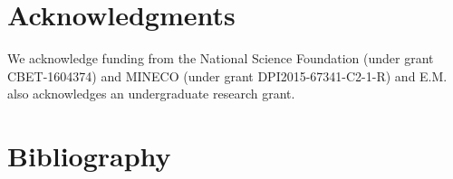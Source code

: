 \begin{refsection}[referencesCh2]
{\color{red}{CHECK IF ALL THESE VARIABLES APPEAR IN THE CHAPTER}}
\vspace{-0.8cm}
\begingroup     
\let\clearpage\relax
%

%
\glsaddall
\setlength\LTleft{0pt}
\setlength\LTright{0pt}
\setlength\glsdescwidth{0.8\hsize}
\renewcommand*{\glossarypreamble}{\vspace{-0.8cm}}
\printglossary[type=SetsCh2, style=long]
\vspace{10pt}
\printglossary[type=ParamCh2, style=long]
\vspace{10pt}
\printglossary[type=VarCh2, style=long]
\endgroup

\section*{Acknowledgments} \label{section:Acknowledgments}
We acknowledge funding from the National Science Foundation (under grant CBET-1604374) and MINECO (under grant DPI2015-67341-C2-1-R) and E.M. also acknowledges an undergraduate research grant.

\section*{Bibliography}

\printbibliography[heading=none]
\end{refsection}
